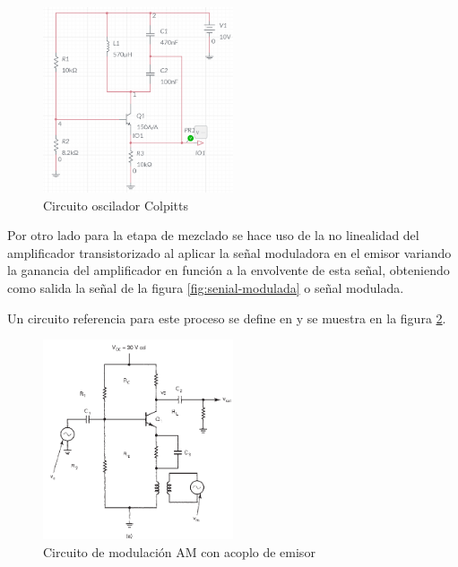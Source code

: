 \documentclass[conference]{IEEEtran}
\begin{document}
	\begin{figure}[h]
		\centering
		\includegraphics[width=0.5\textwidth]{media/oscilador-colpitts}
		\caption{Circuito oscilador Colpitts}
		\label{fig:oscilador-colpitts}
	\end{figure}
	
	Por otro lado para la etapa de mezclado se hace uso de la no linealidad del amplificador transistorizado al aplicar la señal moduladora en el emisor variando la ganancia del amplificador en función a la envolvente de esta señal, obteniendo como salida la señal de la figura \ref{fig:senial-modulada} o señal modulada.
	
	Un circuito referencia para este proceso se define en \cite{tomasi_comunicaciones} y se muestra en la figura \ref{fig:circuito-modulante-tomasi}. 
	
	\newpage
	
	\begin{figure}[h]
		\centering
		\includegraphics[width=0.5\textwidth]{media/circuito-modulante-tomasi}
		\caption{Circuito de modulación AM con acoplo de emisor}
		\label{fig:circuito-modulante-tomasi}
	\end{figure}
	
	
	
	
\end{document}

